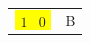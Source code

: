 \documentclass{article}
\begin{document}
\begin{tabular}{cc}
\colorbox{yellow}{$\begin{array}{cc}1 &0\end{array}$} & B\\
\end{tabular}
\end{document}
